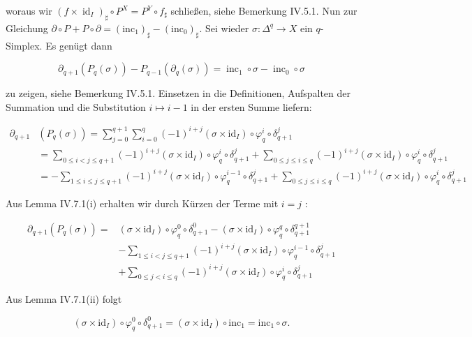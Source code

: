 \documentclass[10pt, letterpaper]{article}
\begin{document}
woraus wir $\left(f \times \operatorname{id}_I\right)_{\sharp} \circ P^X=P^Y \circ f_{\sharp}$ schließen, siehe Bemerkung IV.5.1.
Nun zur Gleichung $\partial \circ P+P \circ \partial=\left(\mathrm{inc}_1\right)_{\sharp}-\left(\mathrm{inc}_0\right)_{\sharp}$. Sei wieder $\sigma: \Delta^q \rightarrow X$ ein $q$-Simplex. Es genügt dann

$$
\partial_{q+1}\left(P_q(\sigma)\right)-P_{q-1}\left(\partial_q(\sigma)\right)=\operatorname{inc}_1 \circ \sigma-\operatorname{inc}_0 \circ \sigma
$$

zu zeigen, siehe Bemerkung IV.5.1. Einsetzen in die Definitionen, Aufspalten der Summation und die Substitution $i \mapsto i-1$ in der ersten Summe liefern:

$$
\begin{aligned}
\partial_{q+1} & \left(P_q(\sigma)\right)=\sum_{j=0}^{q+1} \sum_{i=0}^q(-1)^{i+j}\left(\sigma \times \mathrm{id}_I\right) \circ \varphi_q^i \circ \delta_{q+1}^j \\
& =\sum_{0 \leq i<j \leq q+1}(-1)^{i+j}\left(\sigma \times \mathrm{id}_I\right) \circ \varphi_q^i \circ \delta_{q+1}^j+\sum_{0 \leq j \leq i \leq q}(-1)^{i+j}\left(\sigma \times \mathrm{id}_I\right) \circ \varphi_q^i \circ \delta_{q+1}^j \\
& =-\sum_{1 \leq i \leq j \leq q+1}(-1)^{i+j}\left(\sigma \times \mathrm{id}_I\right) \circ \varphi_q^{i-1} \circ \delta_{q+1}^j+\sum_{0 \leq j \leq i \leq q}(-1)^{i+j}\left(\sigma \times \mathrm{id}_I\right) \circ \varphi_q^i \circ \delta_{q+1}^j
\end{aligned}
$$

Aus Lemma IV.7.1(i) erhalten wir durch Kürzen der Terme mit $i=j$ :

$$
\begin{aligned}
\partial_{q+1}\left(P_q(\sigma)\right)= & \left(\sigma \times \mathrm{id}_I\right) \circ \varphi_q^0 \circ \delta_{q+1}^0-\left(\sigma \times \mathrm{id}_I\right) \circ \varphi_q^q \circ \delta_{q+1}^{q+1} \\
& -\sum_{1 \leq i<j \leq q+1}(-1)^{i+j}\left(\sigma \times \mathrm{id}_I\right) \circ \varphi_q^{i-1} \circ \delta_{q+1}^j \\
& +\sum_{0 \leq j<i \leq q}(-1)^{i+j}\left(\sigma \times \mathrm{id}_I\right) \circ \varphi_q^i \circ \delta_{q+1}^j
\end{aligned}
$$


Aus Lemma IV.7.1(ii) folgt

$$
\left(\sigma \times \mathrm{id}_I\right) \circ \varphi_q^0 \circ \delta_{q+1}^0=\left(\sigma \times \mathrm{id}_I\right) \circ \mathrm{inc}_1=\mathrm{inc}_1 \circ \sigma .
$$
\end{document}
